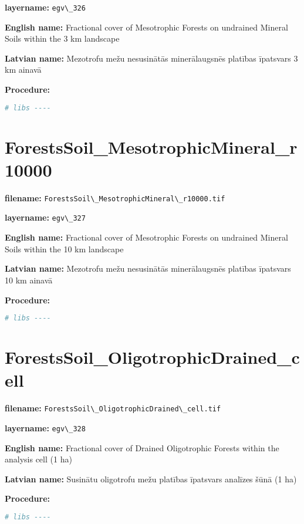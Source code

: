 \documentclass[
]{book}
\newcommand{\passthrough}[1]{#1}
\begin{document}
\textbf{layername:} \passthrough{\lstinline!egv\_326!}

\textbf{English name:} Fractional cover of Mesotrophic Forests on undrained Mineral Soils within the 3 km landscape

\textbf{Latvian name:} Mezotrofu mežu nesusinātās minerālaugsnēs platības īpatsvars 3 km ainavā

\textbf{Procedure:}

\begin{lstlisting}[language=R]
# libs ----
\end{lstlisting}

\section{ForestsSoil\_MesotrophicMineral\_r10000}\label{ch06.327}

\textbf{filename:} \passthrough{\lstinline!ForestsSoil\_MesotrophicMineral\_r10000.tif!}

\textbf{layername:} \passthrough{\lstinline!egv\_327!}

\textbf{English name:} Fractional cover of Mesotrophic Forests on undrained Mineral Soils within the 10 km landscape

\textbf{Latvian name:} Mezotrofu mežu nesusinātās minerālaugsnēs platības īpatsvars 10 km ainavā

\textbf{Procedure:}

\begin{lstlisting}[language=R]
# libs ----
\end{lstlisting}

\section{ForestsSoil\_OligotrophicDrained\_cell}\label{ch06.328}

\textbf{filename:} \passthrough{\lstinline!ForestsSoil\_OligotrophicDrained\_cell.tif!}

\textbf{layername:} \passthrough{\lstinline!egv\_328!}

\textbf{English name:} Fractional cover of Drained Oligotrophic Forests within the analysis cell (1 ha)

\textbf{Latvian name:} Susinātu oligotrofu mežu platības īpatsvars analīzes šūnā (1 ha)

\textbf{Procedure:}

\begin{lstlisting}[language=R]
# libs ----
\end{lstlisting}
\end{document}
